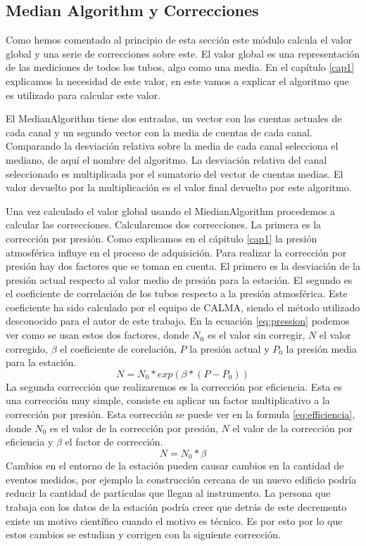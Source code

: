 	\subsection{Median Algorithm y Correcciones}
		Como hemos comentado al principio de esta sección este módulo calcula el valor global y una serie de correcciones sobre este. El valor
		global es una representación de las mediciones de todos los tubos, algo como una media. En el capítulo \ref{cap1} explicamos la
		necesidad de este valor, en este vamos a explicar el algoritmo que es utilizado para calcular este valor.
	  	\par 
		El MedianAlgorithm\cite{MedianAlgr} tiene dos entradas, un vector con las cuentas actuales de cada canal y un segundo vector con la
		media de cuentas de cada canal. Comparando la desviación relativa sobre la media de cada canal selecciona el mediano, de aquí el
		nombre del algoritmo. La desviación relativa del canal seleccionado es multiplicada por el sumatorio del vector de cuentas medias.
		El valor devuelto por la multiplicación es el valor final devuelto por este algoritmo. 
		\par 
		Una vez calculado el valor global usando el MiedianAlgorithm procedemos a calcular las correcciones. Calcularemos dos correcciones.
		La primera es la corrección por presión. Como explicamos en el cápitulo \ref{cap1} la presión atmosférica influye en el proceso de
		adquisición. Para realizar la corrección por presión hay dos factores que se toman en cuenta. El primero es la desviación de la
		presión actual respecto al valor medio de presión para la estación. El segundo es el coeficiente de correlación de los tubos
		respecto a la presión atmosférica. Este coeficiente ha sido calculado por el equipo de CALMA, siendo el método utilizado desconocido
		para el autor de este trabajo. En la ecuación \ref{eq:pression} podemos ver como se usan estos dos factores, donde $N_0$ es el valor
		sin corregir, $N$ el valor corregido, $\beta$ el coeficiente de corelación, $P$ la presión actual y $P_0$ la presión media para la
		estación.
		\begin{equation}\label{eq:pression}
		  N=N_0*exp(\beta*(P-P_0))
		\end{equation}
		La segunda corrección que realizaremos es la corrección por eficiencia. Esta es una corrección muy simple, consiste en aplicar un
		factor multiplicativo a la corrección por presión. Esta corrección se puede ver en la formula \ref{eq:efficiencia}, donde $N_0$ es
		el valor de la corrección por presión, $N$ el valor de la corrección por eficiencia y $\beta$ el factor de corrección. 
		\begin{equation}\label{eq:efficiencia}
		  N=N_0*\beta
		\end{equation}
		Cambios en el entorno de la estación pueden causar cambios en la cantidad de eventos medidos, por ejemplo la construcción cercana
		de un nuevo edificio podría reducir la cantidad de partículas que llegan al instrumento. La persona que trabaja con los datos de la
		estación podría creer que detrás de este decremento existe un motivo científico cuando el motivo es técnico. Es por esto por lo que
		estos cambios se estudian y corrigen con la siguiente corrección.

